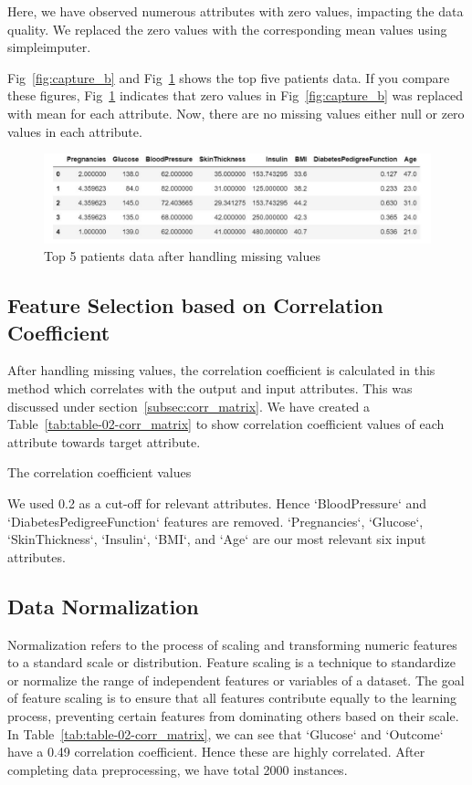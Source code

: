 Here, we have observed numerous attributes with zero values, impacting the data quality. We replaced the zero values with the corresponding mean values using simpleimputer.

Fig~\ref{fig:capture_b} and Fig~\ref{fig:capture_f} shows the top five patients data. If you compare these figures, Fig~\ref{fig:capture_f} indicates that zero values in Fig~\ref{fig:capture_b} was replaced with mean for each attribute. Now, there are no missing values either null or zero values in each attribute.

\begin{figure}[ht]
    \centering    \includegraphics[scale=0.8]{figures/data_info_after_imputer.pdf}
    \caption{Top 5 patients data after handling missing values}
    \label{fig:capture_f}
\end{figure}

\subsection{Feature Selection based on Correlation Coefficient}
After handling missing values, the correlation coefficient is calculated in this method which correlates with the output and input attributes. This was discussed under section~\ref{subsec:corr_matrix}. We have created a Table~\ref{tab:table-02-corr_matrix} to show correlation coefficient values of each attribute towards target attribute.

 \begin{table}[ht!]
    \centering
    \caption{The correlation coefficient values}
    
    \label{tab:table-02-corr_matrix}
\end{table}

We used 0.2 as a cut-off for relevant attributes. Hence   `BloodPressure` and `DiabetesPedigreeFunction` features are removed. `Pregnancies`, `Glucose`, `SkinThickness`, `Insulin`, `BMI`, and `Age` are our most relevant six input attributes.

\subsection{Data Normalization}
Normalization refers to the process of scaling and transforming numeric features to a standard scale or distribution. Feature scaling is a technique to standardize or normalize the range of independent features or variables of a dataset. The goal of feature scaling is to ensure that all features contribute equally to the learning process, preventing certain features from dominating others based on their scale. In Table~\ref{tab:table-02-corr_matrix}, we can see that `Glucose` and `Outcome` have a 0.49 correlation coefficient. Hence these are highly correlated. After completing data preprocessing, we have total 2000 instances.

